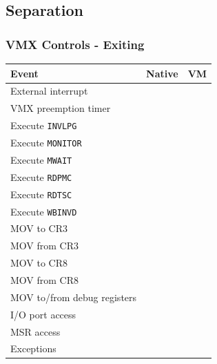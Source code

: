 \documentclass[xcolor={dvipsnames}]{beamer}
\begin{document}
\subsection{Separation}
\begin{frame}\frametitle{VMX Controls - Exiting}

\begin{small}
\begin{table}[h]
	\centering
	\begin{tabular}{l|c|c}
		\textbf{Event} & \textbf{Native} & \textbf{VM} \\
		\hline
		External interrupt          & \checkmark & \checkmark  \\
		VMX preemption timer        & \checkmark & \checkmark  \\
		Execute \texttt{INVLPG}	    & \checkmark & \checkmark \\
		Execute \texttt{MONITOR}    & \checkmark & \checkmark \\
		Execute \texttt{MWAIT}      & \checkmark & \checkmark \\
		Execute \texttt{RDPMC}      & \checkmark & \checkmark \\
		Execute \texttt{RDTSC}      & \checkmark & \checkmark \\
		Execute \texttt{WBINVD}     & \checkmark & \checkmark \\
		MOV to CR3                  & \checkmark & \\
		MOV from CR3                & \checkmark & \\
		MOV to CR8                  & \checkmark & \checkmark \\
		MOV from CR8                & \checkmark & \checkmark \\
		MOV to/from debug registers & \checkmark & \checkmark \\
		\hline
		I/O port access & \checkmark & \checkmark \\
		MSR access      & \checkmark & \checkmark \\
		Exceptions      & \checkmark & \\
	\end{tabular}
\end{table}
\end{small}
\end{frame}
\end{document}
